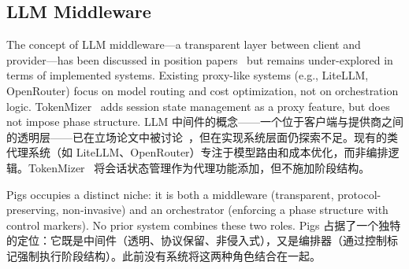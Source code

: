 \subsection{LLM Middleware}

The concept of LLM middleware---a transparent layer between client and provider---has been discussed in position papers~\citep{dzanic2024middleware} but remains under-explored in terms of implemented systems. Existing proxy-like systems (e.g., LiteLLM, OpenRouter) focus on model routing and cost optimization, not on orchestration logic. TokenMizer~\citep{liu2026tokenmizer} adds session state management as a proxy feature, but does not impose phase structure.
LLM 中间件的概念——一个位于客户端与提供商之间的透明层——已在立场论文中被讨论~\citep{dzanic2024middleware}，但在实现系统层面仍探索不足。现有的类代理系统（如 LiteLLM、OpenRouter）专注于模型路由和成本优化，而非编排逻辑。TokenMizer~\citep{liu2026tokenmizer} 将会话状态管理作为代理功能添加，但不施加阶段结构。

Pigs occupies a distinct niche: it is both a middleware (transparent, protocol-preserving, non-invasive) and an orchestrator (enforcing a phase structure with control markers). No prior system combines these two roles.
Pigs 占据了一个独特的定位：它既是中间件（透明、协议保留、非侵入式），又是编排器（通过控制标记强制执行阶段结构）。此前没有系统将这两种角色结合在一起。
